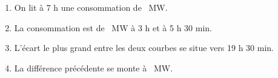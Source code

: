 
\medskip

%
%
%
%
%
%
%
%

\begin{enumerate}
\item %
On lit à 7 h une consommation de ~MW.
\item %
La consommation est de ~MW à 3 h et à 5 h 30 min.
\item %
L'écart le plus grand entre les deux courbes se situe vers 19 h 30 min.
\item %
La différence précédente se monte à ~MW.
\end{enumerate}

\vspace{0,5cm}

